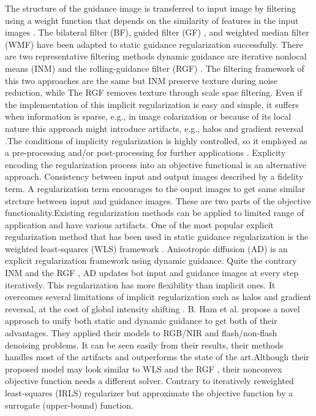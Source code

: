 \documentclass[10pt,twocolumn,letterpaper]{article}
\begin{document}
The structure of the guidance image is transferred to input image by filtering using a weight function that depends on the similarity of features in the input images \cite{Kopf:2007:JBU:1275808.1276497}. The bilateral filter (BF)\cite{tomasi1998bilateral}, guided filter (GF) \cite{he2013guided}, and weighted median filter (WMF) \cite{ma2013constant} have been adapted to static guidance regularization successfully. There are two representative filtering methods dynamic
guidance are iterative nonlocal means (INM)  \cite{brox2008efficient} and the rolling-guidance filter (RGF) \cite{ham2015robust}. The filtering framework of this two approaches are the same but INM preserve texture during noise reduction, while The RGF removes texture through scale spae filtering. Even if the implementation of this implicit regularization is easy and simple, it suffers  when information is sparse, e.g., in image colarization \cite{levin2004colorization} or because of its local nature this approach might introduce artifacts, e.g., halos and gradient reversal  \cite{he2013guided}.The conditions  of implicity regularization is highly controlled, so it employed as a pre-processing and/or post-processing for further applications \cite{lang2012practical,ma2013constant}. Explicity encoding the regularization process into an objective functional is an alternative approach. Consistency between input and output images described by a fidelity term. A regularization term encourages to the ouput images to get same similar strcture between input and guidance images. These are two parts of the objective functionality.Existing regularization methods can be applied to limited range of application and have various artifacts. One of the most popular explicit regularization method that has been used  in static guidance regularization \cite{park2011high} is the weighted least-squares (WLS) framework \cite{farbman2008edge}. Anisotropic diffusion (AD) \cite{perona1990scale} is an explicit regularization framework using dynamic guidance. Quite the contrary INM \cite{brox2008efficient} and the RGF \cite{ham2015robust}, AD updates bot input and guidance images at every step iteratively. This regularization has more flexibility than implicit ones. It overcomes several limitations of implicit regularization such as halos and gradient reversal, at the cost of global intensity shifting \cite{farbman2008edge,he2013guided}.
B. Ham et al. propose a novel approach to unify both static and dynamic guidance to get both of their advantages. They applied their models to RGB/NIR and flash/non-flash denoising problems. It can be seen easily from their results, their methods handles most of the artifacts and outperforms the state of the art.Although their proposed model may look similar to WLS \cite{farbman2008edge} and the RGF \cite{yan2013cross}, their nonconvex objective function needs a different solver. Contrary to iteratively reweighted least-squares (IRLS) \cite{daubechies2010iteratively} regularizer but approximate the objective function by a surrogate (upper-bound) function.
\end{document}
